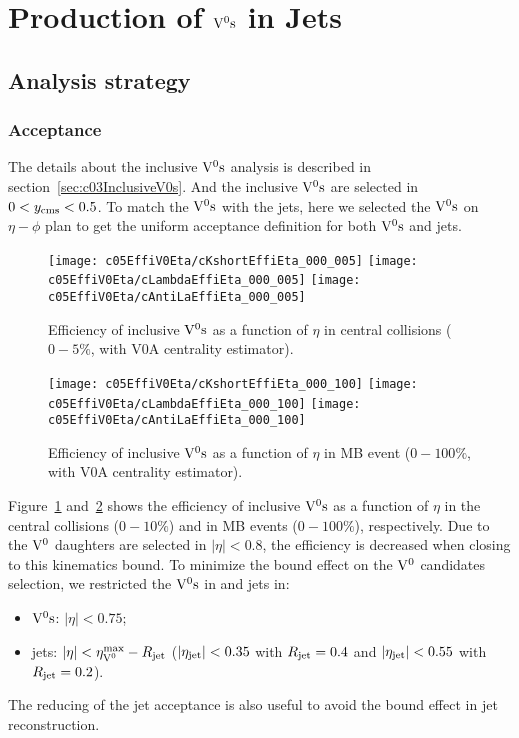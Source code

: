 \section{Production of ${\rm V}^{0}{\rm s}$ in Jets}

\subsection{Analysis strategy}

\subsubsection{Acceptance}\label{sec:c05DefAcc}

The details about the inclusive ${\rm V}^{0}{\rm s}$ analysis is described in
section~\ref{sec:c03InclusiveV0s}.
And the inclusive ${\rm V}^{0}{\rm s}$ are selected in $0<y_{\rm cms}<0.5$.
To match the ${\rm V}^{0}{\rm s}$ with the jets,
here we selected the ${\rm V}^{0}{\rm s}$ on $\eta-\phi$ plan
to get the uniform acceptance definition for both ${\rm V}^{0}{\rm s}$ and jets.

\begin{figure}[htb]
\begin{center}
\texttt{[image: c05EffiV0Eta/cKshortEffiEta\_000\_005]}
\texttt{[image: c05EffiV0Eta/cLambdaEffiEta\_000\_005]}
\texttt{[image: c05EffiV0Eta/cAntiLaEffiEta\_000\_005]}
\caption{Efficiency of inclusive ${\rm V}^{0}{\rm s}$ as a function of $\eta$
         in central collisions ($0-5\%$, with V0A centrality estimator).}
\label{fig:c05EffiV0Eta000005}
\end{center}
\end{figure}

\begin{figure}[!htb]
\begin{center}
\texttt{[image: c05EffiV0Eta/cKshortEffiEta\_000\_100]}
\texttt{[image: c05EffiV0Eta/cLambdaEffiEta\_000\_100]}
\texttt{[image: c05EffiV0Eta/cAntiLaEffiEta\_000\_100]}
\caption{Efficiency of inclusive ${\rm V}^{0}{\rm s}$ as a function of $\eta$
         in MB event ($0-100\%$, with V0A centrality estimator).}
\label{fig:c05EffiV0Eta000100}
\end{center}
\end{figure}

Figure~\ref{fig:c05EffiV0Eta000005} and~\ref{fig:c05EffiV0Eta000100} shows
the efficiency of inclusive ${\rm V}^{0}{\rm s}$ as a function of $\eta$ in the central
collisions ($0-10\%$) and in MB events ($0-100\%$), respectively.
Due to the ${\rm V}^{0}$ daughters are selected in $|\eta|<0.8$,
the efficiency is decreased when closing to this kinematics bound.
To minimize the bound effect on the ${\rm V}^{0}$ candidates selection,
we restricted the ${\rm V}^{0}{\rm s}$ in and jets in:
\begin{itemize}
\item ${\rm V}^{0}{\rm s}$: $|\eta|<0.75$;
\item jets: $|\eta|<\eta_{{\rm V}^{0}}^{\max}-R_{\rm jet}$ ($|\eta_{\rm jet}|<0.35$
      with $R_{\rm jet}=0.4$
      and $|\eta_{\rm jet}|<0.55$ with $R_{\rm jet}=0.2$).
\end{itemize}
The reducing of the jet acceptance is also useful to avoid the bound effect
in jet reconstruction.

